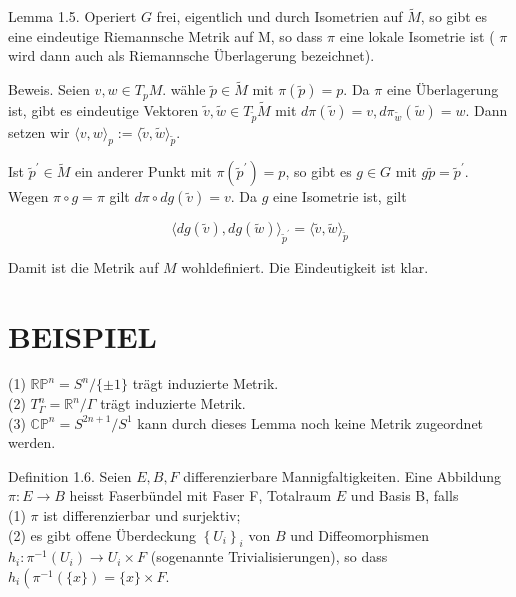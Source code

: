 \documentclass[10pt]{article}
\begin{document}
Lemma 1.5. Operiert $G$ frei, eigentlich und durch Isometrien auf $\tilde{M}$, so gibt es eine eindeutige Riemannsche Metrik auf M, so dass $\pi$ eine lokale Isometrie ist ( $\pi$ wird dann auch als Riemannsche Überlagerung bezeichnet).

Beweis. Seien $v, w \in T_{p} M$. wähle $\tilde{p} \in \tilde{M}$ mit $\pi(\tilde{p})=p$. Da $\pi$ eine Überlagerung ist, gibt es eindeutige Vektoren $\tilde{v}, \tilde{w} \in T_{\tilde{p}} \tilde{M}$ mit $d \pi(\tilde{v})=v, d \pi_{\tilde{w}}(\tilde{w})=w$. Dann setzen wir $\langle v, w\rangle_{p}:=\langle\tilde{v}, \tilde{w}\rangle_{\tilde{p}}$.

Ist $\tilde{p}^{\prime} \in \tilde{M}$ ein anderer Punkt mit $\pi\left(\tilde{p}^{\prime}\right)=p$, so gibt es $g \in G$ mit $g \tilde{p}=\tilde{p}^{\prime}$. Wegen $\pi \circ g=\pi$ gilt $d \pi \circ d g(\tilde{v})=v$. Da $g$ eine Isometrie ist, gilt

$$
\langle d g(\tilde{v}), d g(\tilde{w})\rangle_{\tilde{p}^{\prime}}=\langle\tilde{v}, \tilde{w}\rangle_{\tilde{p}}
$$

Damit ist die Metrik auf $M$ wohldefiniert. Die Eindeutigkeit ist klar.

\section*{BEISPIEL}
(1) $\mathbb{R} \mathbb{P}^{n}=S^{n} /\{ \pm 1\}$ trägt induzierte Metrik.\\
(2) $T_{\Gamma}^{n}=\mathbb{R}^{n} / \Gamma$ trägt induzierte Metrik.\\
(3) $\mathbb{C P}^{n}=S^{2 n+1} / S^{1}$ kann durch dieses Lemma noch keine Metrik zugeordnet werden.

Definition 1.6. Seien $E, B, F$ differenzierbare Mannigfaltigkeiten. Eine Abbildung $\pi: E \rightarrow B$ heisst Faserbündel mit Faser F, Totalraum $E$ und Basis B, falls\\
(1) $\pi$ ist differenzierbar und surjektiv;\\
(2) es gibt offene Überdeckung $\left\{U_{i}\right\}_{i}$ von $B$ und Diffeomorphismen $h_{i}: \pi^{-1}\left(U_{i}\right) \rightarrow U_{i} \times F$ (sogenannte Trivialisierungen), so dass $h_{i}\left(\pi^{-1}(\{x\})=\{x\} \times F\right.$.
\end{document}
